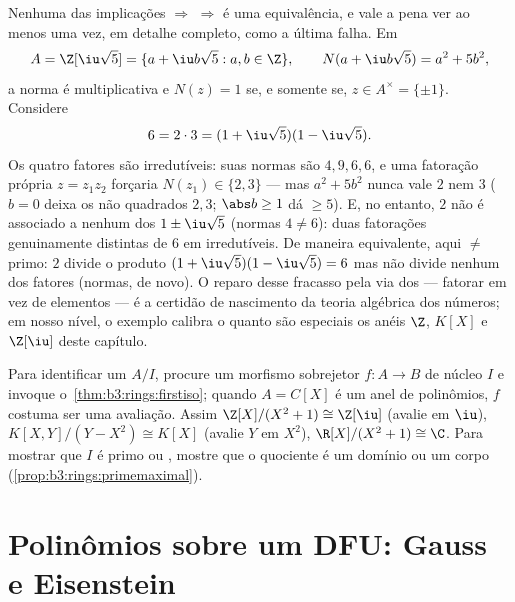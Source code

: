 \begin{example}
\label{ex:b3:rings:nonufd}
Nenhuma das implicações  $\Rightarrow$  $\Rightarrow$  é uma
equivalência, e vale a pena ver ao menos uma vez, em detalhe completo,
como a última falha. Em
\[
A = \Z[\iu\sqrt5] = \{a + \iu b\sqrt5 : a, b \in \Z\},
\qquad N(a + \iu b\sqrt5) = a^2 + 5b^2,
\]
a norma é multiplicativa e $N(z) = 1$ se, e somente se, $z \in
A^\times = \{\pm1\}$. Considere
\[
6 = 2 \cdot 3 = (1 + \iu\sqrt5)(1 - \iu\sqrt5).
\]
Os quatro fatores são irredutíveis: suas normas são $4, 9, 6,
6$, e uma
fatoração própria $z = z_1z_2$ forçaria $N(z_1) \in \{2, 3\}$ --- mas $a^2 + 5b^2$ nunca vale $2$
nem $3$ ($b = 0$ deixa os não quadrados $2, 3$; $\abs b \geq
1$ dá
$\geq 5$). E, no entanto, $2$ não é associado a nenhum dos
$1 \pm
\iu\sqrt5$ (normas $4 \neq 6$): duas fatorações genuinamente distintas de
$6$ em irredutíveis. De maneira equivalente, aqui 
$\neq$ primo: $2$ divide o produto $(1 +
\iu\sqrt5)(1 - \iu\sqrt5) = 6$ mas não divide nenhum
dos fatores (normas, de novo). O reparo desse fracasso pela via dos
 --- fatorar \emph{} em vez de elementos --- é a certidão
de nascimento da teoria algébrica dos números; em nosso nível, o
exemplo calibra o quanto são especiais os anéis  $\Z$,
$K[X]$ e $\Z[\iu]$ deste capítulo.
\end{example}

\begin{method}\label{met:b3:rings:quotient}
Para identificar um  $A/I$, procure um morfismo
sobrejetor $f \colon A \to B$ de núcleo $I$ e invoque o~\cref{thm:b3:rings:firstiso}; quando
$A = C[X]$ é um anel de polinômios, $f$ costuma ser uma avaliação. Assim
$\Z[X]/(X^2+1) \cong
\Z[\iu]$ (avalie em $\iu$), $K[X,Y]/(Y - X^2) \cong K[X]$ (avalie $Y$ em $X^2$),
$\R[X]/(X^2+1) \cong \C$. Para mostrar que $I$ é primo ou , mostre que o
quociente é um domínio ou um corpo (\cref{prop:b3:rings:primemaximal}).
\end{method}

\section{Polinômios sobre um DFU: Gauss e Eisenstein}


